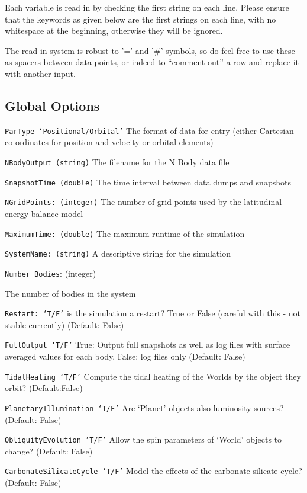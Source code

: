 \documentclass[usenatbib,11pt]{article}
\begin{document}
Each variable is read in by checking the first string on each line.  Please ensure that the keywords as given below are the first strings on each line, with no whitespace at the beginning, otherwise they will be ignored.  

The read in system is robust to '=' and '\#' symbols, so do feel free to use these as spacers between data points, or indeed to ``comment out'' a row and replace it with another input. 

\subsection{Global Options}

\begin{itemize}
\item{\texttt{ParType `Positional/Orbital'}} The format of data for entry (either Cartesian co-ordinates for position and velocity or orbital elements)
\item{\texttt{NBodyOutput (string)}} The filename for the N Body data file
\item{\texttt{SnapshotTime (double)}} The time interval between data dumps and snapshots
\item{\texttt{NGridPoints: (integer)}} The number of grid points used by the latitudinal energy balance model
\item{\texttt{MaximumTime: (double)}} The maximum runtime of the simulation
\item{\texttt{SystemName: (string)} A descriptive string for the simulation
\item{\texttt{Number Bodies}: (integer)}} The number of bodies in the system
\item{\texttt{Restart: `T/F'}} is the simulation a restart? True or False (careful with this - not stable currently) (Default: False)
\item{\texttt{FullOutput `T/F'}} True: Output full snapshots as well as log files with surface averaged values for each body, False: log files only (Default: False)
\item{\texttt{TidalHeating `T/F'}} Compute the tidal heating of the Worlds by the object they orbit?  (Default:False)
\item{\texttt{PlanetaryIllumination `T/F'}} Are `Planet' objects also luminosity sources? (Default: False)
\item{\texttt{ObliquityEvolution `T/F'}} Allow the spin parameters of `World' objects to change? (Default: False)
\item{\texttt{CarbonateSilicateCycle `T/F'}} Model the effects of the carbonate-silicate cycle? (Default: False)
\end{itemize}
\end{document}
